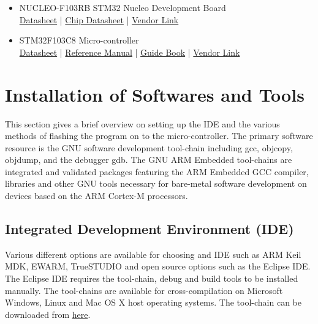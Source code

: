 \documentclass[a4paper,12pt,oneside]{book}
\begin{document}
\begin{itemize}
\item NUCLEO-F103RB STM32 Nucleo Development Board \\
\href{./datasheets/Nucleo STM32 Board.pdf}{Datasheet} | \href{./datasheets/STM32F103X.pdf}{Chip Datasheet} | \href{http://in.element14.com/stmicroelectronics/nucleo-f103rb/nucleo-board-stm32f103rbt6-mcu/dp/2394226}{Vendor Link}\\

\item STM32F103C8 Micro-controller\\
\href{./datasheets/STM32F103X.pdf}{Datasheet} | \href{./datasheets/STM32F1 Reference Manual.pdf}{Reference Manual} | \href{./datasheets/Geoffrey Brown - Discovering the STM32 Microcontroller.pdf}{Guide Book} | \href{http://www.amazon.in/STM32F103C8T6-Minimum-System-Development-Arduino/dp/B01EM11KOC/ref=sr_1_1?ie=UTF8&qid=1499069205&sr=8-1&keywords=STM32F103C8T6}{Vendor Link}\\
\end{itemize}

\section{Installation of Softwares and Tools}
This section gives a brief overview on setting up the IDE and the various methods of flashing the program on to the micro-controller. The primary software resource is the GNU software development tool-chain including gcc, objcopy, objdump, and the debugger gdb. The GNU ARM Embedded tool-chains are integrated and validated packages featuring the ARM Embedded GCC compiler, libraries and other GNU tools necessary for bare-metal software development on devices based on the ARM Cortex-M processors.\cite{geob, gnu}\\

\clearpage

\subsection{Integrated Development Environment (IDE)}
Various different options are available for choosing and IDE such as ARM Keil MDK, EWARM, TrueSTUDIO and open source options such as the Eclipse IDE. The Eclipse IDE requires the tool-chain, debug and build tools to be installed manually. The tool-chains are available for cross-compilation on Microsoft Windows, Linux and Mac OS X host operating systems. The tool-chain can be downloaded from \href{https://launchpad.net/gcc-arm-embedded/}{here}.\cite{gnu}\\
\end{document}
